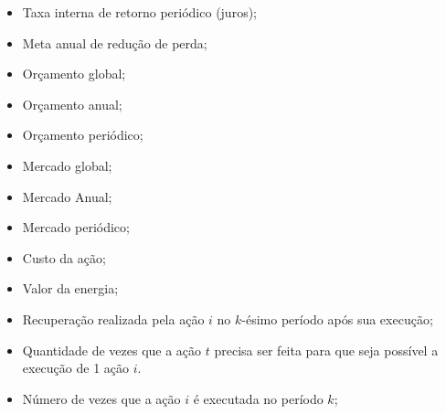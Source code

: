 \begin{multicols}{2}

\begin{itemize}
  \item {} Taxa interna de retorno periódico (juros);
\end{itemize}

\begin{itemize}
  \item {} Meta anual de redução de perda;
  \item {} Orçamento global;
  \item {} Orçamento anual;
  \item {} Orçamento periódico;
\end{itemize}

\vfill \columnbreak

\begin{itemize}
  \item {} Mercado global;
  \item {} Mercado Anual;
  \item {} Mercado periódico;
  \item {} Custo da ação;
  \item {} Valor da energia;
  \item {} Recuperação realizada pela ação $i$ no $k$-ésimo período
    após sua execução;
  \item {} Quantidade de vezes que a ação $t$ precisa ser
  	feita para que seja possível a execução de 1 ação $i$.
\end{itemize}

\end{multicols}

\pagebreak

\begin{itemize}
  \item {} Número de vezes que a ação $i$ é executada no período $k$;
\end{itemize}

